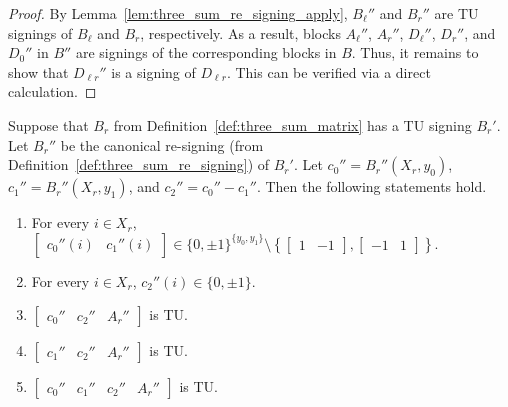 \begin{proof}
    By Lemma~\ref{lem:three_sum_re_signing_apply}, $B_{\ell}''$ and $B_{r}''$ are TU signings of $B_{\ell}$ and $B_{r}$, respectively. As a result, blocks $A_{\ell}''$, $A_{r}''$, $D_{\ell}''$, $D_{r}''$, and $D_{0}''$ in $B''$ are signings of the corresponding blocks in $B$. Thus, it remains to show that $D_{\ell r}''$ is a signing of $D_{\ell r}$. This can be verified via a direct calculation. 
\end{proof}

\begin{lemma}\label{lem:three_sum_signing_B_r_props}
    Suppose that $B_{r}$ from Definition~\ref{def:three_sum_matrix} has a TU signing $B_{r}'$. Let $B_{r}''$ be the canonical re-signing (from Definition~\ref{def:three_sum_re_signing}) of $B_{r}'$. Let $c_{0}'' = B_{r}'' (X_{r}, y_{0})$, $c_{1}'' = B_{r}'' (X_{r}, y_{1})$, and $c_{2}'' = c_{0}'' - c_{1}''$. Then the following statements hold.
    \begin{enumerate}
        \item\label{item:tss_Brp_c01} For every $i \in X_{r}$, $\begin{bmatrix} c_{0}'' (i) & c_{1}'' (i) \end{bmatrix} \in \{0, \pm 1\}^{\{y_{0}, y_{1}\}} \setminus \left\{ \begin{bmatrix} 1 & -1 \end{bmatrix}, \begin{bmatrix} -1 & 1 \end{bmatrix} \right\}$.
        \item\label{item:tss_Brp_c2} For every $i \in X_{r}$, $c_{2}'' (i) \in \{0, \pm 1\}$.
        \item\label{item:tss_Brp_tu1} $\begin{bmatrix} c_{0}'' & c_{2}'' & A_{r}'' \end{bmatrix}$ is TU.
        \item\label{item:tss_Brp_tu2} $\begin{bmatrix} c_{1}'' & c_{2}'' & A_{r}'' \end{bmatrix}$ is TU.
        \item\label{item:tss_Brp_tu3} $\begin{bmatrix} c_{0}'' & c_{1}'' & c_{2}'' & A_{r}'' \end{bmatrix}$ is TU.
    \end{enumerate}
\end{lemma}

